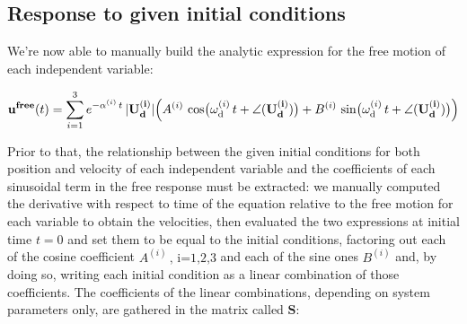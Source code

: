 \documentclass[a4paper,12pt,oneside]{article}
\begin{document}
\subsection{Response to given initial conditions}
\label{subs:free_motion_given_initial_conditions}

We're now able to manually build the analytic expression for the free motion of each independent variable:

\[
	\mathbf{u^{free}}(t) =
		\sum_{i=1}^3 e^{-\alpha^{(i)} \, t} \, |\mathbf{U_d^{(i)}}|
		\Bigl(A^{(i)} \,
		\cos\bigl(\omega_\textup{d}^{(i)} \, t + \angle(\mathbf{U_d^{(i)}})\bigr) +
		B^{(i)} \,
		\sin\bigl(\omega_\textup{d}^{(i)} \, t + \angle(\mathbf{U_d^{(i)}})\bigr)\Bigr)
\]

Prior to that, the relationship between the given initial conditions for both position and velocity of each independent variable and the coefficients of each sinusoidal term in the free response must be extracted: we manually computed the derivative with respect to time of the equation relative to the free motion for each variable to obtain the velocities, then evaluated the two expressions at initial time $ t = 0 $ and set them to be equal to the initial conditions, factoring out each of the cosine coefficient $ A^{(i)} \, \text{, i=1,2,3} $ and each of the sine ones $ B^{(i)} $ and, by doing so, writing each initial condition as a linear combination of those coefficients. The coefficients of the linear combinations, depending on system parameters only, are gathered in the matrix called $ \mathbf{S} $:
\end{document}
